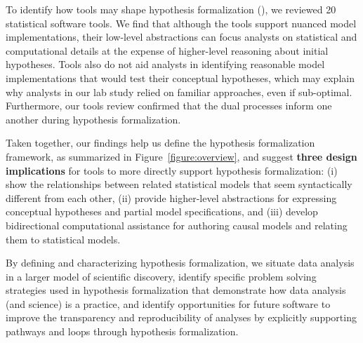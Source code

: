 
To identify how tools may shape hypothesis formalization (\rqTools), we reviewed
20 statistical software tools. We find that although the tools support nuanced
model implementations, their low-level abstractions can focus analysts on
statistical and computational details at the expense of higher-level reasoning
about initial hypotheses. Tools also do not aid analysts in identifying
reasonable model implementations that would test their conceptual hypotheses,
which may explain why analysts in our lab study relied on familiar approaches,
even if sub-optimal. Furthermore, our tools review confirmed that the dual
processes inform one another during hypothesis formalization. 

Taken together, our findings help us define the hypothesis formalization
framework, as summarized in Figure~\ref{figure:overview}, and suggest
\textbf{three design implications} for tools to more directly support hypothesis
formalization: (i) show the relationships between related statistical models
that seem syntactically different from each other, (ii) provide higher-level
abstractions for expressing conceptual hypotheses and partial model
specifications, and (iii) develop bidirectional computational assistance for
authoring causal models and relating them to statistical models.

By defining and characterizing hypothesis formalization, we situate data
analysis in a larger model of scientific discovery, identify specific problem
solving strategies used in hypothesis formalization that demonstrate how data
analysis (and science) is a practice, and identify opportunities for future
software to improve the transparency and reproducibility of analyses by
explicitly supporting pathways and loops through hypothesis formalization.












